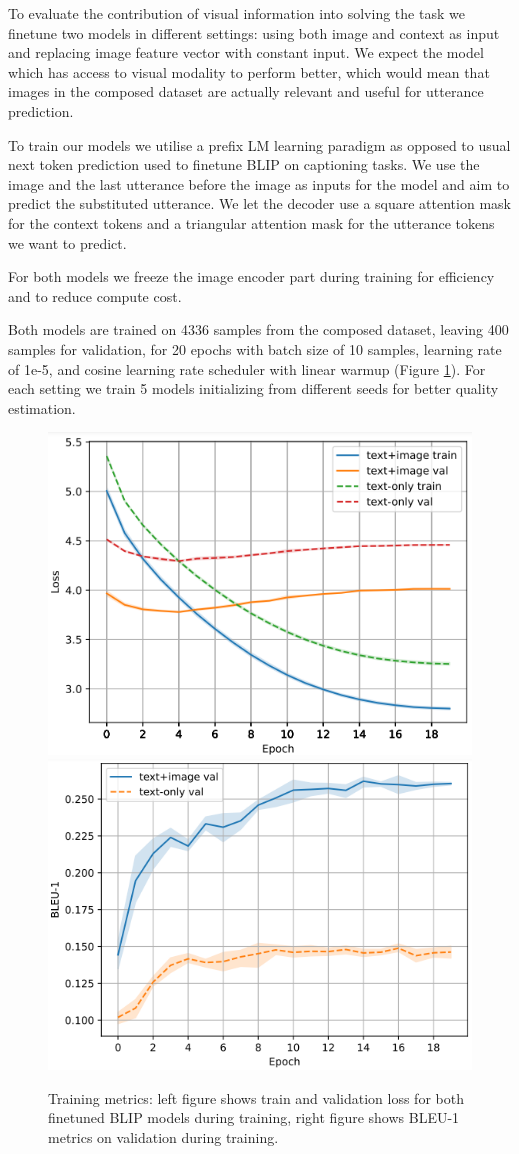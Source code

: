 
To evaluate the contribution of visual information into solving the task we finetune two models in different settings: using both image and context as input and replacing image feature vector with constant input. We expect the model which has access to visual modality to perform better, which would mean that images in the composed dataset are actually relevant and useful for utterance prediction.

To train our models we utilise a prefix LM learning paradigm as opposed to usual next token prediction used to finetune BLIP on captioning tasks. We use the image and the last utterance before the image as inputs for the model and aim to predict the substituted utterance. We let the decoder use a square attention mask for the context tokens and a triangular attention mask for the utterance tokens we want to predict.

For both models we freeze the image encoder part during training for efficiency and to reduce compute cost.

Both models are trained on 4336 samples from the composed dataset, leaving 400 samples for validation, for 20 epochs with batch size of 10 samples, learning rate of 1e-5, and cosine learning rate scheduler with linear warmup (Figure \ref{fig:bleu_val}). For each setting we train 5 models initializing from different seeds for better quality estimation.

\begin{figure}[h]
    \centering
    \includegraphics[width=0.49\linewidth]{sections/loss.png}
    \includegraphics[width=0.49\linewidth]{sections/bleu_val.png}
    \caption{Training metrics: left figure shows train and validation loss for both finetuned BLIP models during training, right figure shows BLEU-1 metrics on validation during training.}
    \label{fig:bleu_val}
\end{figure}